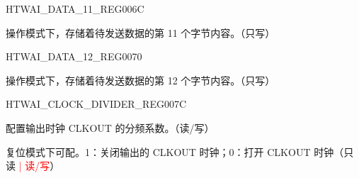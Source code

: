 \begin{register}{H}{TWAI\_DATA\_11\_REG}{\hexprefix{}006C}\label{regdesc:TWAIDATA11REG}
%
%
\regnewline%
\begin{regdesc}\begin{reglist}
\label{fielddesc:TWAITXBYTE11}\item [TWAI\_TX\_BYTE\_11] 操作模式下，存储着待发送数据的第 11 个字节内容。（只写）
\end{reglist}\end{regdesc}
\end{register}


\begin{register}{H}{TWAI\_DATA\_12\_REG}{\hexprefix{}0070}\label{regdesc:TWAIDATA12REG}
%
%
\regnewline%
\begin{regdesc}\begin{reglist}
\label{fielddesc:TWAITXBYTE12}\item [TWAI\_TX\_BYTE\_12] 操作模式下，存储着待发送数据的第 12 个字节内容。（只写）
\end{reglist}\end{regdesc}
\end{register}


\begin{register}{H}{TWAI\_CLOCK\_DIVIDER\_REG}{\hexprefix{}007C}\label{regdesc:TWAICLOCKDIVIDERREG}
%
%
%
\regnewline%
\begin{regdesc}\begin{reglist}
\label{fielddesc:TWAICD}\item [TWAI\_CD] 配置输出时钟 CLKOUT 的分频系数。（读/写）
\label{fielddesc:TWAICLOCKOFF}\item [TWAI\_CLOCK\_OFF] 复位模式下可配。1：关闭输出的 CLKOUT 时钟；0：打开 CLKOUT 时钟（只读 \textcolor{red}{| 读/写}）
\end{reglist}\end{regdesc}
\end{register}


